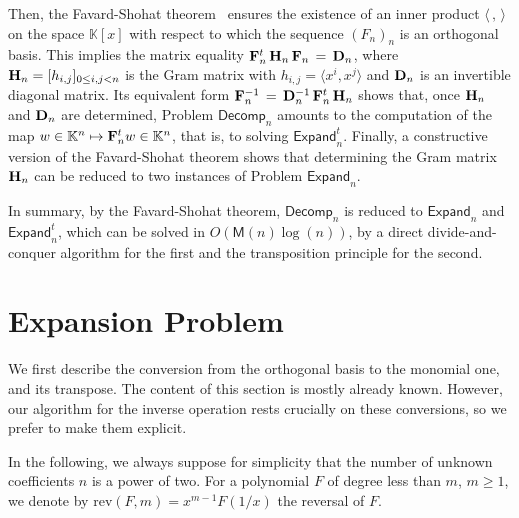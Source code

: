 \documentclass{elsart}
\def\K {\ensuremath{\mathbb{K}}}
\def\M {\ensuremath{\mathsf{M}}}
\def\E{\textsf{Expand}}
\def\D{\textsf{Decomp}}
\def\rev{\mathrm{rev}}
\begin{document}
Then, the Favard-Shohat theorem~\cite{Favard35,Shohat36} ensures the
existence of an inner product $\langle \, , \, \rangle$ on the space
$\K[x]$ with respect to which the sequence $(F_n)_n$ is an orthogonal
basis. This implies the matrix equality $ {\bf F}_n^t \, {\bf H}_n\,
{\bf F}_n \,=\, {\bf D}_n$, where ${\bf H}_n = [h_{i,j}]_{0 \le i,j <
n}$ is the Gram matrix with $h_{i,j} = \langle x^i, x^j \rangle$ and $
{\bf D}_n$ is an invertible diagonal matrix. Its equivalent form ${\bf
F}_n^{-1} \, = \, {\bf D}_n^{-1}\, {\bf F}_n^t \, {\bf H}_n$ shows
that, once $ {\bf H}_n$ and $ {\bf D}_n$ are determined, Problem
$\D_n$ amounts to the computation of the map $w\in \K^n \mapsto {\bf
F}_n^t w \in \K^n$, that is, to solving $\E^t_n$. Finally, a
constructive version of the Favard-Shohat theorem shows that
determining the Gram matrix ${\bf H}_n$ can be reduced to two
instances of Problem $\E_n$.

In summary, by the Favard-Shohat theorem, $\D_n$ is reduced to $\E_n$
and $\E_n^t$, which can be solved in $O(\M(n)\log(n))$, by a direct
divide-and-conquer algorithm for the first and the transposition
principle for the second.



\section{Expansion Problem}\label{sec:expand}
We first describe the conversion from the orthogonal basis to the
monomial one, and its transpose. The content of this section is mostly
already known. However, our algorithm for the inverse operation rests
crucially on these conversions, so we prefer to make them explicit.

In the following, we always suppose for simplicity that the number of
unknown coefficients $n$ is a power of two. For a polynomial $F$ of degree less
than $m$, $m \geq 1$, we denote by $\rev(F,m)=x^{m-1} F(1/x)$ the reversal
of $F$.
\end{document}
